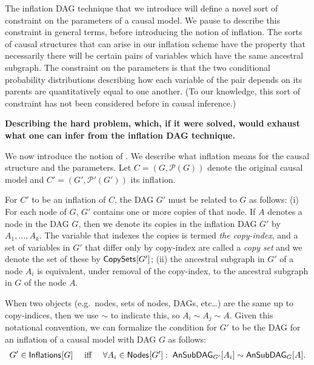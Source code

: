 {The inflation DAG technique that we introduce will define a novel sort of constraint on the parameters of a causal model.  We pause to describe this constraint in general terms, before introducing the notion of inflation.  The sorts of causal structures that can arise in our inflation scheme have the property that necessarily there will be certain pairs of variables which have the same ancestral subgraph.  The constraint on the parameters is that the two conditional probability distributions describing how each variable of the pair depends on its parents are quantitatively equal to one another.  (To our knowledge, this sort of constraint has not been considered before in causal inference.)

{\bf Describing the hard problem, which, if it were solved, would exhaust what one can infer from the inflation DAG technique.}

We now introduce the notion of .  We describe what inflation means for the causal structure and the parameters.  Let $C=(G,\mathcal{P}(G))$ denote the original causal model and $C'=(G',\mathcal{P'}(G'))$ its inflation.

For $C'$ to be an inflation of $C$, the DAG $G'$ must be related to $G$ as follows:  (i) For each node of $G$, $G'$ contains one or more copies of that node. If $A$ denotes a node in the DAG $G$, then we denote its copies in the inflation DAG $G'$ by $A_1,\ldots, A_k$.  The variable that indexes the copies is termed {\em the copy-index}, and a set of variables in $G'$ that differ only by copy-index are called a {\em copy set} and we denote the set of these by $\SmallNamedFunction{CopySets}{G'}$; (ii) the ancestral subgraph in $G'$ of a node $A_i$ is equivalent, under removal of the copy-index, to the ancestral subgraph in $G$ of the node $A$.  

When two objects (e.g.~nodes, sets of nodes, DAGs, etc\ldots) are the same up to copy-indices, then we use $\sim$ to indicate this, so $A_i\sim A_j\sim A$.  Given this notational convention, we can formalize the condition for $G'$ to be the DAG for an inflation of a causal model with DAG $G$ as follows:
\begin{align}\label{eq:definflationDAG}
G' \in\SmallNamedFunction{Inflations}{G} \quad\text{ iff }\quad \forall A_i\in \SmallNamedFunction{Nodes}{G'}:\; \ansubgraph[G']{A_i}\sim\ansubgraph[G]{A}.
\end{align}

}
